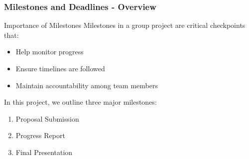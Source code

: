 \documentclass[aspectratio=169]{beamer}
\begin{document}
\begin{frame}[fragile]
    \frametitle{Milestones and Deadlines - Overview}
    \begin{block}{Importance of Milestones}
        Milestones in a group project are critical checkpoints that:
        \begin{itemize}
            \item Help monitor progress
            \item Ensure timelines are followed
            \item Maintain accountability among team members
        \end{itemize}
    \end{block}
    \pause
    In this project, we outline three major milestones: 
    \begin{enumerate}
        \item Proposal Submission
        \item Progress Report
        \item Final Presentation
    \end{enumerate}
\end{frame}
\end{document}
